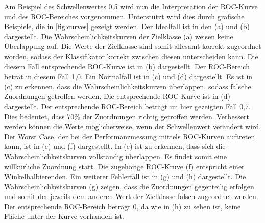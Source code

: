 Am Beispiel des Schwellenwertes 0,5 wird nun die Interpretation der ROC-Kurve und des ROC-Bereiches vorgenommen. Unterstützt wird dies durch grafische Beispiele, die in \autoref{fig:curves} gezeigt werden. Der Idealfall ist in den (a) und (b) dargestellt. Die Wahrscheinlichkeitskurven der Zielklasse (a) weisen keine Überlappung auf. Die Werte der Zielklasse sind somit allesamt korrekt zugeordnet worden, sodass der Klassifikator korrekt zwischen diesen unterscheiden kann. Die diesem Fall entsprechende ROC-Kurve ist in (b) dargestellt. Der ROC-Bereich beträt in diesem Fall 1,0. Ein \glqq Normalfall\grqq{} ist in (c) und (d) dargestellt. Es ist in (c) zu erkennen, dass die Wahrscheinlichkeitskurven überlappen, sodass falsche Zuordnungen getroffen werden. Die entsprechende ROC-Kurve ist in (d) dargestellt. Der entsprechende ROC-Bereich beträgt im hier gezeigten Fall 0,7. Dies bedeutet, dass 70\% der Zuordnungen richtig getroffen werden. Verbessert werden können die Werte möglicherweise, wenn der Schwellenwert verändert wird. Der \glqq Worst Case\grqq, der bei der Performanzmessung mittels ROC-Kurven auftreten kann, ist in (e) und (f) dargestellt. In (e) ist zu erkennen, dass sich die Wahrscheinlichkeitskurven vollständig überlappen. Es findet somit eine willkürliche Zuordnung statt. Die zugehörige ROC-Kruve (f) entspricht einer Winkelhalbierenden. Ein weiterer Fehlerfall ist in (g) und (h) dargestellt. Die Wahrscheinlichkeitskurven (g) zeigen, dass die Zuordnungen gegenteilig erfolgen und somit der jeweils dem anderen Wert der Zielklasse falsch zugeordnet werden. Der entsprechende ROC-Bereich beträgt 0, da wie in (h) zu sehen ist, keine Fläche unter der Kurve vorhanden ist.

